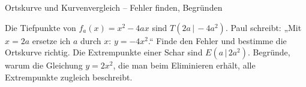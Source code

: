 \begin{aufgabe}{Ortskurve und Kurvenvergleich – Fehler finden, Begründen}
\begin{teile}
\teil Die Tiefpunkte von $f_a(x) = x^2 - 4a x$ sind $T(2a \,|\, -4a^2)$. Paul schreibt: „Mit $x = 2a$ ersetze ich $a$ durch $x$: $y = -4x^2$.“ Finde den Fehler und bestimme die Ortskurve richtig.
\teil Die Extrempunkte einer Schar sind $E(a \,|\, 2a^2)$. Begründe, warum die Gleichung $y = 2x^2$, die man beim Eliminieren erhält, alle Extrempunkte zugleich beschreibt.
\end{teile}
\end{aufgabe}
